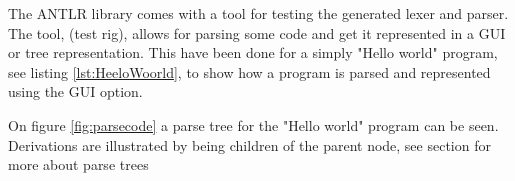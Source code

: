 The ANTLR library comes with a tool for testing the generated lexer and parser. The tool, (test rig), allows for parsing some code and get it represented
in a GUI or tree representation. This have been done for a simply "Hello world" program, see listing \ref{lst:HeeloWoorld}, to show how a program is parsed and represented using the GUI option.


On figure \ref{fig:parsecode} a parse tree for the "Hello world" program can be seen. Derivations are illustrated by being children of the parent node, see section  for more about parse trees